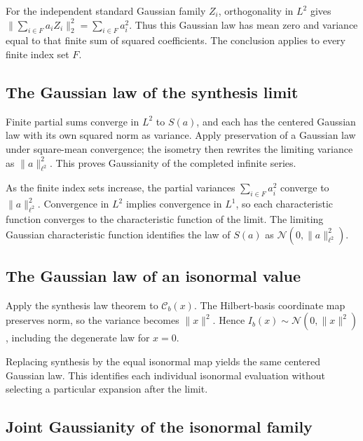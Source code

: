 \documentclass[11pt,a4paper]{report}
\begin{document}
For the independent standard Gaussian family \(Z_i\), orthogonality in \(L^2\) gives \(\|\sum_{i\in F}a_iZ_i\|_2^2=\sum_{i\in F}a_i^2\). Thus this Gaussian law has mean zero and variance equal to that finite sum of squared coefficients. The conclusion applies to every finite index set \(F\).

\subsection{\texorpdfstring{The Gaussian law of the synthesis limit}{The Gaussian law of the synthesis limit}}
\label{report-step-UnadjustedLangevin-GaussianHilbert-lean-23}


Finite partial sums converge in \(L^2\) to \(S(a)\), and each has the centered Gaussian law with its own squared norm as variance. Apply preservation of a Gaussian law under square-mean convergence; the isometry then rewrites the limiting variance as \(\|a\|_{\ell^2}^2\). This proves Gaussianity of the completed infinite series.



As the finite index sets increase, the partial variances \(\sum_{i\in F}a_i^2\) converge to \(\|a\|_{\ell^2}^2\). Convergence in \(L^2\) implies convergence in \(L^1\), so each characteristic function converges to the characteristic function of the limit. The limiting Gaussian characteristic function identifies the law of \(S(a)\) as \(\mathcal N(0,\|a\|_{\ell^2}^2)\).

\subsection{\texorpdfstring{The Gaussian law of an isonormal value}{The Gaussian law of an isonormal value}}
\label{report-step-UnadjustedLangevin-GaussianHilbert-lean-24}


Apply the synthesis law theorem to \(\mathcal C_b(x)\). The Hilbert-basis coordinate map preserves norm, so the variance becomes \(\|x\|^2\). Hence \(I_b(x)\sim\mathcal N(0,\|x\|^2)\), including the degenerate law for \(x=0\).



Replacing synthesis by the equal isonormal map yields the same centered Gaussian law. This identifies each individual isonormal evaluation without selecting a particular expansion after the limit.

\subsection{\texorpdfstring{Joint Gaussianity of the isonormal family}{Joint Gaussianity of the isonormal family}}
\label{report-step-UnadjustedLangevin-GaussianHilbert-lean-25}
\end{document}
